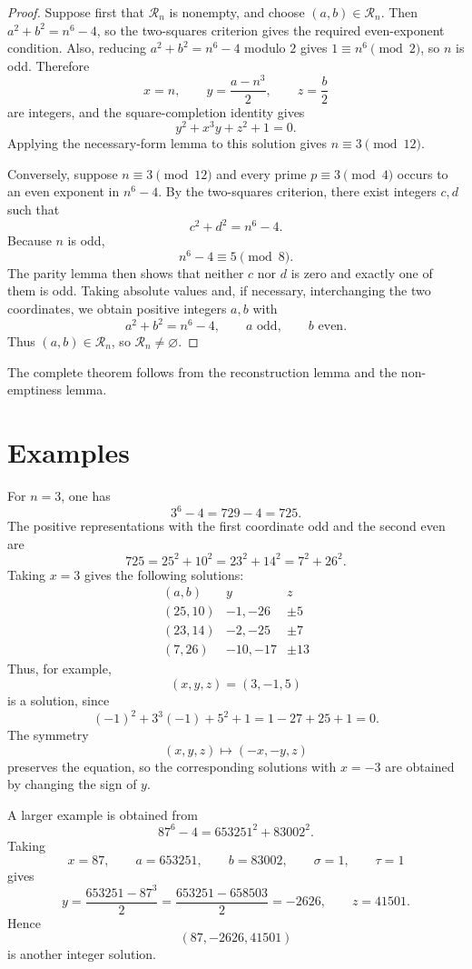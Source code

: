 \documentclass[11pt]{article}
\theoremstyle{definition}
\theoremstyle{remark}
\begin{document}
\begin{proof}
Suppose first that $\mathcal R_n$ is nonempty, and choose $(a,b)\in\mathcal R_n$.  Then $a^2+b^2=n^6-4$, so the two-squares criterion gives the required even-exponent condition.  Also, reducing $a^2+b^2=n^6-4$ modulo $2$ gives $1\equiv n^6\pmod2$, so $n$ is odd.  Therefore
\[
        x=n,
        \qquad
        y=\frac{a-n^3}{2},
        \qquad
        z=\frac b2
\]
are integers, and the square-completion identity gives
\[
        y^2+x^3y+z^2+1=0.
\]
Applying the necessary-form lemma to this solution gives $n\equiv3\pmod {12}$.

Conversely, suppose $n\equiv3\pmod {12}$ and every prime $p\equiv3\pmod4$ occurs to an even exponent in $n^6-4$.  By the two-squares criterion, there exist integers $c,d$ such that
\[
        c^2+d^2=n^6-4.
\]
Because $n$ is odd,
\[
        n^6-4\equiv5\pmod8.
\]
The parity lemma then shows that neither $c$ nor $d$ is zero and exactly one of them is odd.  Taking absolute values and, if necessary, interchanging the two coordinates, we obtain positive integers $a,b$ with
\[
        a^2+b^2=n^6-4,
        \qquad
        a\text{ odd},
        \qquad
        b\text{ even}.
\]
Thus $(a,b)\in\mathcal R_n$, so $\mathcal R_n\ne\varnothing$.
\end{proof}

The complete theorem follows from the reconstruction lemma and the non-emptiness lemma.

\section{Examples}

For $n=3$, one has
\[
        3^6-4=729-4=725.
\]
The positive representations with the first coordinate odd and the second even are
\[
        725=25^2+10^2=23^2+14^2=7^2+26^2.
\]
Taking $x=3$ gives the following solutions:
\[
\begin{array}{c|c|c}
(a,b)& y & z \\
\hline
(25,10)& -1,-26 & \pm5 \\
(23,14)& -2,-25 & \pm7 \\
(7,26)& -10,-17 & \pm13
\end{array}
\]
Thus, for example,
\[
        (x,y,z)=(3,-1,5)
\]
is a solution, since
\[
        (-1)^2+3^3(-1)+5^2+1=1-27+25+1=0.
\]
The symmetry
\[
        (x,y,z)\mapsto(-x,-y,z)
\]
preserves the equation, so the corresponding solutions with $x=-3$ are obtained by changing the sign of $y$.

A larger example is obtained from
\[
        87^6-4=653251^2+83002^2.
\]
Taking
\[
        x=87,
        \qquad
        a=653251,
        \qquad
        b=83002,
        \qquad
        \sigma=1,
        \qquad
        \tau=1
\]
gives
\[
        y=\frac{653251-87^3}{2}
        =\frac{653251-658503}{2}
        =-2626,
        \qquad
        z=41501.
\]
Hence
\[
        (87,-2626,41501)
\]
is another integer solution.
\end{document}

